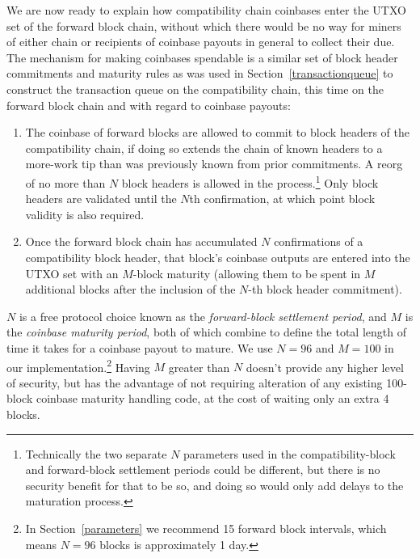 We are now ready to explain how compatibility chain coinbases enter
the UTXO set of the forward block chain, without which there would be
no way for miners of either chain or recipients of coinbase payouts in
general to collect their due.  The mechanism for making coinbases
spendable is a similar set of block header commitments and maturity
rules as was used in Section~\ref{transactionqueue} to construct the
transaction queue on the compatibility chain, this time on the forward
block chain and with regard to coinbase payouts:

\begin{enumerate}
  \item
    The coinbase of forward blocks are allowed to commit to block
    headers of the compatibility chain, if doing so extends the chain
    of known headers to a more-work tip than was previously known from
    prior commitments.  A reorg of no more than $N$ block headers is
    allowed in the process.\footnote{Technically the two separate $N$
    parameters used in the compatibility-block and forward-block
    settlement periods could be different, but there is no security
    benefit for that to be so, and doing so would only add delays to
    the maturation process.}  Only block headers are validated until
    the $N$th confirmation, at which point block validity is also
    required.

  \item
    Once the forward block chain has accumulated $N$ confirmations of
    a compatibility block header, that block's coinbase outputs are
    entered into the UTXO set with an $M$-block maturity (allowing
    them to be spent in $M$ additional blocks after the inclusion of
    the $N$-th block header commitment).
\end{enumerate}

$N$ is a free protocol choice known as the \emph{forward-block
  settlement period}, and $M$ is the \emph{coinbase maturity period},
  both of which combine to define the total length of time it takes
  for a coinbase payout to mature.  We use $N = 96$ and $M = 100$ in
  our implementation.\footnote{In Section~\ref{parameters} we
  recommend \SI{15}{\min} forward block intervals, which means $N =
  96$ blocks is approximately \num{1} day.}  Having $M$ greater than
  $N$ doesn't provide any higher level of security, but has the
  advantage of not requiring alteration of any
  existing \num{100}-block coinbase maturity handling code, at the
  cost of waiting only an extra \num{4} blocks.

